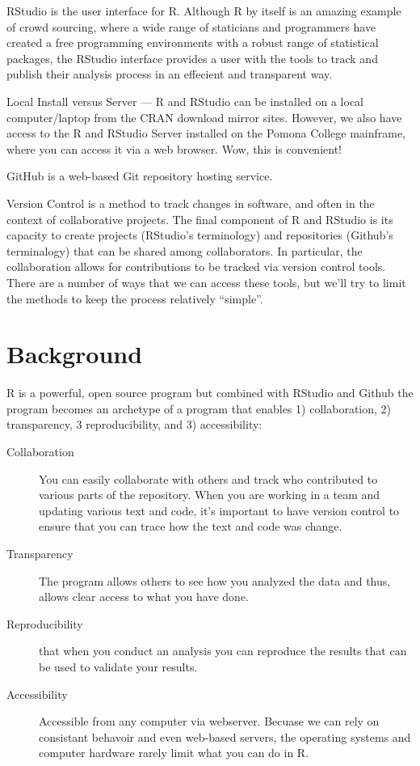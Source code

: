 \documentclass[12pt]{../SOP4_alpha}\usepackage[]{graphicx}\usepackage[]{xcolor}
\begin{document}
\NP RStudio is the user interface for R. Although R by itself is an amazing example of crowd sourcing, where a wide range of staticians and programmers have created a free programming environments with a robust range of statistical packages, the RStudio interface provides a user with the tools to track and publish their analysis process in an effecient and transparent way. 

\NP Local Install versus Server --- R and RStudio can be installed on a local computer/laptop from the CRAN download mirror sites. However, we also have access to the R and RStudio Server installed on the Pomona College mainframe, where you can access it via a web browser. Wow, this is convenient!

\NP GitHub is a web-based Git repository hosting service. 

\NP Version Control is a method to track changes in software, and often in the context of collaborative projects. The final component of R and RStudio is its capacity to create projects (RStudio's terminology) and repositories (Github's terminalogy) that can be shared among collaborators. In particular, the collaboration allows for contributions to be tracked via version control tools. There are a number of ways that we can access these tools, but we'll try to limit the methods to keep the process relatively ``simple''.


\section{Background}

\NP R is a powerful, open source program but combined with RStudio and Github the program becomes an archetype of a program that enables 1) collaboration, 2) transparency, 3 reproducibility, and 3) accessibility: 

\begin{description}
    \item[Collaboration] You can easily collaborate with others and track who contributed to various parts of the repository. When you are working in a team and updating various text and code, it's important to have version control to ensure that you can trace how the text and code was change. 


  \item[Transparency] The program allows others to see how you analyzed the data and thus, allows clear access to what you have done.
    
  \item[Reproducibility]  that when you conduct an analysis you can reproduce the results that can be used to validate your results. 
  
  \item[Accessibility] Accessible from any computer via webserver. Becuase we can rely on consistant behavoir and even web-based servers, the operating systems and computer hardware rarely limit what you can do in R.

\end{description}
\end{document}
